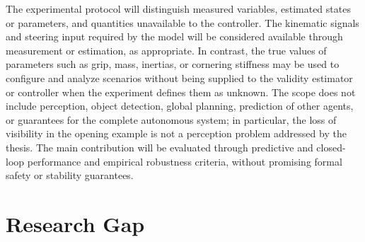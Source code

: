 \documentclass[12pt,a4paper]{report}
\begin{document}
The experimental protocol will distinguish measured variables, estimated states or parameters, and quantities unavailable to the controller. The kinematic signals and steering input required by the model will be considered available through measurement or estimation, as appropriate. In contrast, the true values of parameters such as grip, mass, inertias, or cornering stiffness may be used to configure and analyze scenarios without being supplied to the validity estimator or controller when the experiment defines them as unknown. The scope does not include perception, object detection, global planning, prediction of other agents, or guarantees for the complete autonomous system; in particular, the loss of visibility in the opening example is not a perception problem addressed by the thesis. The main contribution will be evaluated through predictive and closed-loop performance and empirical robustness criteria, without promising formal safety or stability guarantees. 

\section{Research Gap}

%
%
%
%
%
%
%
\end{document}
